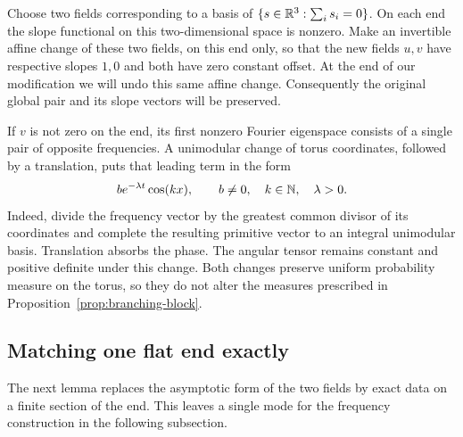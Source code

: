 Choose two fields corresponding to a basis of
$\{s\in\mathbb R^3:\sum_i s_i=0\}$.  On each end the slope functional on this
two-dimensional space is nonzero.  Make an invertible affine change of
these two fields, on this end only, so that the new fields $u,v$ have
respective slopes $1,0$ and both have zero constant offset.  At the end
of our modification we will undo this same affine change.  Consequently
the original global pair and its slope vectors will be preserved.

If $v$ is not zero on the end, its first nonzero Fourier eigenspace
consists of a single pair of opposite frequencies.  A unimodular change
of torus coordinates, followed by a translation, puts that leading term
in the form
\begin{equation}\label{bl:leading-mode}
 b e^{-\lambda t}\cos(kx),\qquad b\ne0,\quad k\in\mathbb N,
 \quad\lambda>0.
\end{equation}
Indeed, divide the frequency vector by the greatest common divisor of
its coordinates and complete the resulting primitive vector to an
integral unimodular basis.  Translation absorbs the phase.  The angular
tensor remains constant and positive definite under this change.
Both changes preserve uniform probability measure on the torus, so they
do not alter the measures prescribed in Proposition~\ref{prop:branching-block}.

\subsection{Matching one flat end exactly}

The next lemma replaces the asymptotic form of the two fields by exact
data on a finite section of the end.  This leaves a single mode for the
frequency construction in the following subsection.


